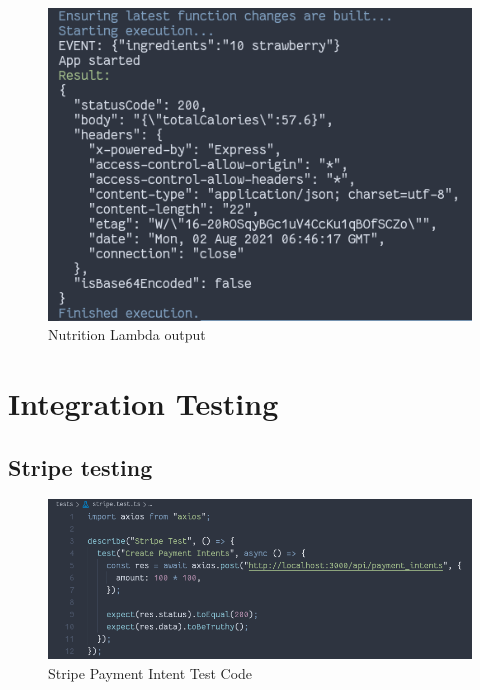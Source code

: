 \begin{figure}[!hb]
\centering
\caption[Nutrition Lambda output]{Nutrition Lambda output}%
\label{fig:nutrition_lambda_output}
\includegraphics[width=\linewidth,height=\textheight,keepaspectratio]{img/nutrition_lambda_output}
\end{figure}

\clearpage

\section{Integration Testing} 

\subsection{Stripe testing}


\begin{figure}[!hb]
\centering
\caption[Stripe Payment Intent Test Code]{Stripe Payment Intent Test Code}%
\label{fig:stripe_payment_intent_test_code}
\includegraphics[width=\linewidth,height=\textheight,keepaspectratio]{img/stripe_payment_intent_test_code}
\end{figure}

